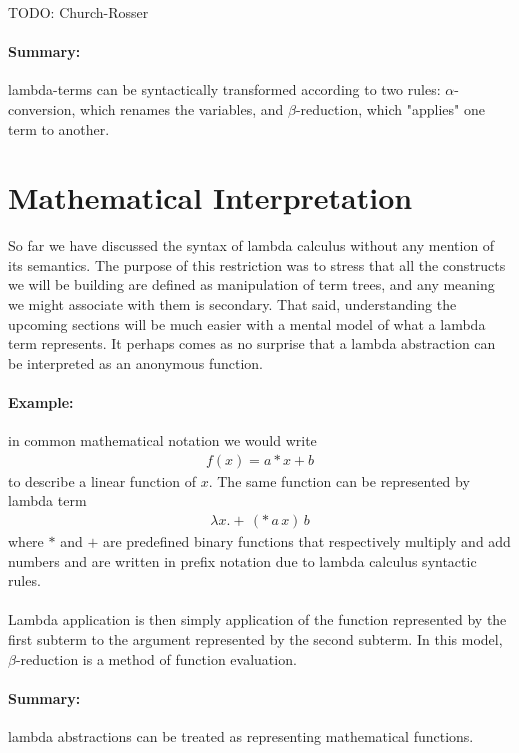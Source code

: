 \documentclass[11pt,twoside,a4paper]{article} %
\begin{document}
TODO: Church-Rosser

\paragraph{Summary:} lambda-terms can be syntactically transformed according to 
two rules: $\alpha$-conversion, which renames the variables, and $\beta$-reduction,
which "applies" one term to another.

\section{Mathematical Interpretation}

So far we have discussed the syntax of lambda calculus without any mention of
its semantics. The purpose of this restriction was to stress that all the
constructs we will be building are defined as manipulation of term trees,
and any meaning we might associate with them is secondary. That said,
understanding the upcoming sections will be much easier with a mental model of
what a lambda term represents. It perhaps comes as no surprise that a lambda
abstraction can be interpreted as an anonymous function. 

\paragraph{Example:} in common mathematical notation we would write 
\begin{align*}
f(x)=a*x+b
\end{align*}
to describe a linear function of $x$. The same function can be represented by 
lambda term 
\begin{align*}
\lambda x.+\,(*\,a\,x)\,b
\end{align*}
where $*$ and $+$ are predefined binary 
functions that respectively multiply and add numbers and are written in prefix
notation due to lambda calculus syntactic rules.
\\\\
Lambda application is then simply application of the function represented by
the first subterm to the argument represented by the second subterm. In this
model, $\beta$-reduction is a method of function evaluation.

\paragraph{Summary:} lambda abstractions can be treated as representing mathematical 
functions.
\end{document}
